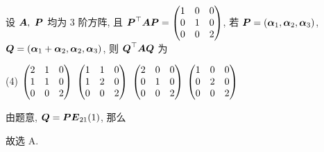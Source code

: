 \begin{example}[2009 数二]
    设 $\vb*{A},~\vb*{P}$ 均为 3 阶方阵, 且 $\vb*{P}^\top\vb*{AP}=\mqty(1&0&0\\0&1&0\\0&0&2)$, 若 $\vb*{P}=(\vb*{\alpha}_1,\vb*{\alpha}_2,\vb*{\alpha}_3)$, $\vb*{Q}=(\vb*{\alpha}_1+\vb*{\alpha}_2,\vb*{\alpha}_2,\vb*{\alpha}_3)$, 
    则 $\vb*{Q}^\top\vb*{AQ}$ 为
    \begin{tasks}(4)
        \task $\mqty(2&1&0\\1&1&0\\0&0&2)$
        \task $\mqty(1&1&0\\1&2&0\\0&0&2)$
        \task $\mqty(2&0&0\\0&1&0\\0&0&2)$
        \task $\mqty(1&0&0\\0&2&0\\0&0&2)$
    \end{tasks}
\end{example}
\begin{solution}
    由题意, $\vb*{Q}=\vb*{PE}_{21}(1)$, 那么
    故选 A.
\end{solution}

